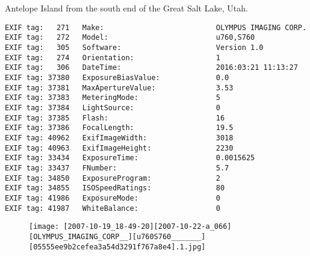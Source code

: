 \section{\protect{}}
\noindent Antelope Island from the south end of the Great Salt Lake, Utah.
\noindent
\begin{lstlisting}
EXIF tag:   271   Make:                          OLYMPUS IMAGING CORP.  
EXIF tag:   272   Model:                         u760,S760       
EXIF tag:   305   Software:                      Version 1.0                    
EXIF tag:   274   Orientation:                   1
EXIF tag:   306   DateTime:                      2016:03:21 11:13:27
EXIF tag: 37380   ExposureBiasValue:             0.0
EXIF tag: 37381   MaxApertureValue:              3.53
EXIF tag: 37383   MeteringMode:                  5
EXIF tag: 37384   LightSource:                   0
EXIF tag: 37385   Flash:                         16
EXIF tag: 37386   FocalLength:                   19.5
EXIF tag: 40962   ExifImageWidth:                3018
EXIF tag: 40963   ExifImageHeight:               2230
EXIF tag: 33434   ExposureTime:                  0.0015625
EXIF tag: 33437   FNumber:                       5.7
EXIF tag: 34850   ExposureProgram:               2
EXIF tag: 34855   ISOSpeedRatings:               80
EXIF tag: 41986   ExposureMode:                  0
EXIF tag: 41987   WhiteBalance:                  0

\end{lstlisting}
\clearpage
\begin{figure}
\raggedleft
\texttt{[image: [2007-10-19\_18-49-20][2007-10-22-a\_066][OLYMPUS\_IMAGING\_CORP\_\_][u760S760\_\_\_\_\_\_\_][05555ee9b2cefea3a54d3291f767a8e4].1.jpg]}
\end{figure}


\clearpage
